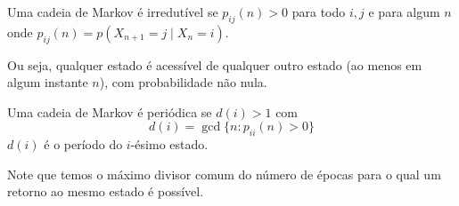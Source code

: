 \begin{definition}
  Uma cadeia de Markov é irredutível se $p_{ij}(n) > 0$ para todo $i,j$ e para algum $n$ onde
  $p_{ij}(n) = p(X_{n+1} = j \mid X_{n} = i)$.
\end{definition}
Ou seja, qualquer estado é acessível de qualquer outro estado (ao menos em algum instante $n$),
com probabilidade não nula.

\begin{definition}
  Uma cadeia de Markov é periódica se $d(i) > 1$ com
  \begin{equation}
  d(i) = \gcd \{ n : p_{ii}(n) > 0 \}
  \end{equation}
  $d(i)$ é o período do $i$-ésimo estado.
\end{definition}
Note que temos o máximo divisor comum do número de épocas para o qual um retorno ao mesmo estado é possível.


